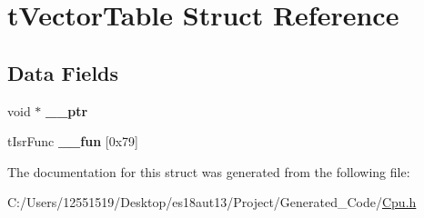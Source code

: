 \hypertarget{structt_vector_table}{}\section{t\+Vector\+Table Struct Reference}
\label{structt_vector_table}
\subsection*{Data Fields}
\begin{DoxyCompactItemize}
\item 
\hypertarget{structt_vector_table_a324d365e9c8c6c033f4edbc906f94844}{}void $\ast$ {\bfseries \+\_\+\+\_\+ptr}\label{structt_vector_table_a324d365e9c8c6c033f4edbc906f94844}

\item 
\hypertarget{structt_vector_table_a6001c7c57c392674cadaf831203e4606}{}t\+Isr\+Func {\bfseries \+\_\+\+\_\+fun} \mbox{[}0x79\mbox{]}\label{structt_vector_table_a6001c7c57c392674cadaf831203e4606}

\end{DoxyCompactItemize}


The documentation for this struct was generated from the following file\+:\begin{DoxyCompactItemize}
\item 
C\+:/\+Users/12551519/\+Desktop/es18aut13/\+Project/\+Generated\+\_\+\+Code/\hyperlink{_cpu_8h}{Cpu.\+h}\end{DoxyCompactItemize}
